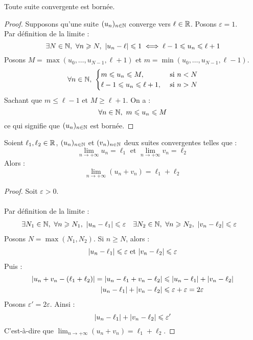\begin{theorem}
    Toute suite convergente est bornée.
\end{theorem}

\begin{proof}
    Supposons qu'une suite $(u_n)_{n \in \mathbb{N}}$ converge vers $\ell \in \mathbb{R}$.
    Posons $\varepsilon = 1$. 
    \\
    Par définition de la limite :
    \[ \exists N \in \mathbb{N},\ \forall n \geqslant N,\ \abs{u_n - \ell} \leqslant 1 \iff \ell - 1 \leqslant u_n \leqslant \ell + 1 \]
    Posons $M = \max(u_0, \ldots, u_{N-1}, \ell + 1)$ et $m = \min(u_0, \ldots, u_{N - 1}, \ell - 1)$.
    \begin{align*}
        \forall n \in \N,\ 
        \begin{cases}
            m \leq u_n \leq M, &\text{ si } n < N \\
            \ell - 1 \leq u_n \leq \ell + 1, &\text{ si } n > N
        \end{cases}
    \end{align*}
    Sachant que $m \leq \ell - 1$ et $M \geq \ell + 1$.
    On a :
    \[ \forall n \in \mathbb{N},\ m \leqslant u_n \leqslant M \]
    ce qui signifie que $(u_n)_{n \in \mathbb{N}}$ est bornée.
\end{proof}

\begin{theorem}
    Soient $\ell_1, \ell_2 \in \mathbb{R}$, $(u_n)_{n \in \mathbb{N}}$ et $(v_n)_{n \in \mathbb{N}}$ deux suites convergentes telles que :
    \[ \lim_{n \to +\infty} u_n = \ell_1 \text{ et } \lim_{n \to +\infty} v_n = \ell_2 \]
    Alors :
    \[ \lim_{n \to +\infty} (u_n + v_n) = \ell_1 + \ell_2 \]
\end{theorem}

\begin{proof}
    Soit $\varepsilon > 0$.
    \\
    \\
    Par définition de la limite :
    \begin{align*}
        &\exists N_1 \in \mathbb{N},\ \forall n \geqslant N_1,\ \abs{u_n - \ell_1} \leqslant \varepsilon &
        &\exists N_2 \in \mathbb{N},\ \forall n \geqslant N_2,\ \abs{v_n - \ell_2} \leqslant \varepsilon
    \end{align*}
    Posons $N = \max(N_1, N_2)$. Si $n \geq N$, alors :
    \begin{align*}
        \abs{u_n - \ell_1} \leqslant \varepsilon \text{ et } \abs{v_n - \ell_2} \leqslant \varepsilon
    \end{align*}
    Puis : 
    \begin{align*}
        \abs{u_n + v_n - (\ell_1 + \ell_2)} = \abs{u_n - \ell_1 + v_n - \ell_2} &\leqslant \abs{u_n - \ell_1} + \abs{v_n - \ell_2} \\
        \abs{u_n - \ell_1} + \abs{v_n - \ell_2} &\leqslant \varepsilon + \varepsilon = 2 \varepsilon
    \end{align*}
    Posons $\varepsilon' = 2\varepsilon$.
    Ainsi : 
    \[ \abs{u_n - \ell_1} + \abs{v_n - \ell_2} \leqslant \varepsilon' \]
    C'est-à-dire que $\lim_{n \to +\infty} (u_n + v_n) = \ell_1 + \ell_2$.
\end{proof}

